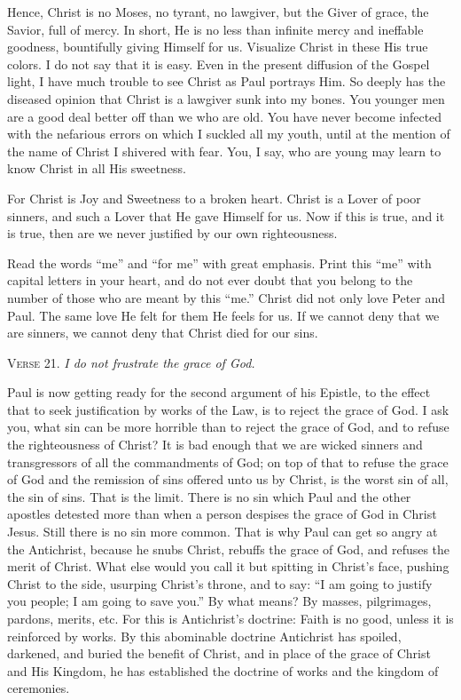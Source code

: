 Hence, Christ is no Moses, no tyrant, no lawgiver, but the Giver of grace, the Savior, full of mercy. In short, He is no less than infinite mercy and ineffable goodness, bountifully giving Himself for us. Visualize Christ in these His true colors. I do not say that it is easy. Even in the present diffusion of the Gospel light, I have much trouble to see Christ as Paul portrays Him. So deeply has the diseased opinion that Christ is a lawgiver sunk into my bones. You younger men are a good deal better off than we who are old. You have never become infected with the nefarious errors on which I suckled all my youth, until at the mention of the name of Christ I shivered with fear. You, I say, who are young may learn to know Christ in all His sweetness.

For Christ is Joy and Sweetness to a broken heart. Christ is a Lover of poor sinners, and such a Lover that He gave Himself for us. Now if this is true, and it is true, then are we never justified by our own righteousness.

Read the words “me” and “for me” with great emphasis. Print this “me” with capital letters in your heart, and do not ever doubt that you belong to the number of those who are meant by this “me.” Christ did not only love Peter and Paul. The same love He felt for them He feels for us. If we cannot deny that we are sinners, we cannot deny that Christ died for our sins.

\textsc{Verse} 21. \emph{I do not frustrate the grace of God.}

Paul is now getting ready for the second argument of his Epistle, to the effect that to seek justification by works of the Law, is to reject the grace of God. I ask you, what sin can be more horrible than to reject the grace of God, and to refuse the righteousness of Christ? It is bad enough that we are wicked sinners and transgressors of all the commandments of God; on top of that to refuse the grace of God and the remission of sins offered unto us by Christ, is the worst sin of all, the sin of sins. That is the limit. There is no sin which Paul and the other apostles detested more than when a person despises the grace of God in Christ Jesus. Still there is no sin more common. That is why Paul can get so angry at the Antichrist, because he snubs Christ, rebuffs the grace of God, and refuses the merit of Christ. What else would you call it but spitting in Christ’s face, pushing Christ to the side, usurping Christ’s throne, and to say: “I am going to justify you people; I am going to save you.” By what means? By masses, pilgrimages, pardons, merits, etc. For this is Antichrist’s doctrine: Faith is no good, unless it is reinforced by works. By this abominable doctrine Antichrist has spoiled, darkened, and buried the benefit of Christ, and in place of the grace of Christ and His Kingdom, he has established the doctrine of works and the kingdom of ceremonies.

